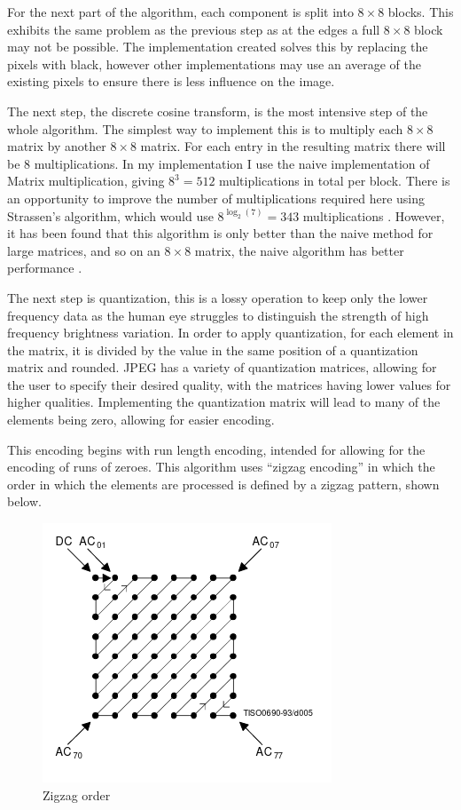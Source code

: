 \documentclass[12pt,a4paper]{article}
\begin{document}
For the next part of the algorithm, each component is split into $8\times 8$ blocks. This exhibits the same problem as the previous step as at the edges a full $8\times 8$ block may not be possible. The implementation created solves this by replacing the pixels with black, however other implementations may use an average of the existing pixels to ensure there is less influence on the image.

The next step, the discrete cosine transform, is the most intensive step of the whole algorithm. The simplest way to implement this is to multiply each $8\times 8$ matrix by another $8\times 8$ matrix. For each entry in the resulting matrix there will be $8$ multiplications. In my implementation I use the naive implementation of Matrix multiplication, giving $8^3 = 512$ multiplications in total per block. There is an opportunity to improve the number of multiplications required here using Strassen's algorithm, which would use $8^{\log_2(7)}=343$ multiplications \cite{strassen1969gaussian}. However, it has been found that this algorithm is only better than the naive method for large matrices, and so on an $8\times 8$ matrix, the naive algorithm has better performance \cite{huang2016strassen}.


The next step is quantization, this is a lossy operation to keep only the lower frequency data as the human eye struggles to distinguish the strength of high frequency brightness variation. In order to apply quantization, for each element in the matrix, it is divided by the value in the same position of a quantization matrix and rounded. JPEG has a variety of quantization matrices, allowing for the user to specify their desired quality, with the matrices having lower values for higher qualities. Implementing the quantization matrix will lead to many of the elements being zero, allowing for easier encoding.

This encoding begins with run length encoding, intended for allowing for the encoding of runs of zeroes. This algorithm uses “zigzag encoding” in which the order in which the elements are processed is defined by a zigzag pattern, shown below.
\begin{figure}[H]
    \centering
    \includegraphics{zigzag.png}
    \caption{Zigzag order \protect\cite{jpeg}}
\end{figure}
\end{document}

